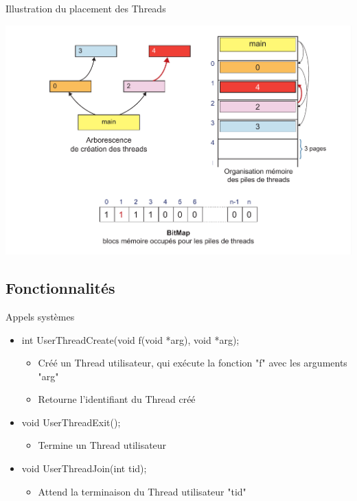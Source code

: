 \documentclass{beamer}
\begin{document}
\begin{frame}{Illustration du placement des Threads}
  	\begin{center}
	  	\includegraphics[scale=0.25]{images/FS5.png}
  	\end{center}
\end{frame}


\subsection{Fonctionnalités}
\begin{frame}
	\begin{block}{Appels systèmes}
		\begin{itemize}
			\item<1-> int UserThreadCreate(void f(void *arg), void *arg);
			\begin{itemize}
				\item<1-> Créé un Thread utilisateur, qui exécute la fonction "f" avec les arguments "arg"
				\item<1-> Retourne l'identifiant du Thread créé
			\end{itemize}
			\item<2-> void UserThreadExit();
			\begin{itemize}
				\item<1-> Termine un Thread utilisateur
			\end{itemize}
			\item<3-> void UserThreadJoin(int tid);
			\begin{itemize}
				\item<1-> Attend la terminaison du Thread utilisateur "tid"
			\end{itemize}
		\end{itemize}
	\end{block}
\end{frame}
\end{document}
